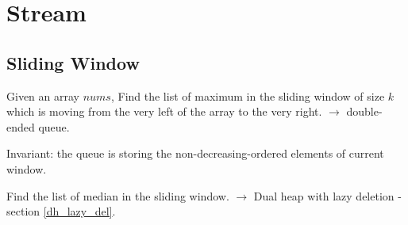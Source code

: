 \chapter{Stream}
\section{Sliding Window}
 Given an array $nums$, Find the list of maximum in the sliding window of size $k$ which is moving from the very left of the array to the very right. $\rightarrow$ double-ended queue.

Invariant: the queue is storing the non-decreasing-ordered elements of current window.

 Find the list of median in the sliding window. $\rightarrow$ Dual heap with lazy deletion - section \ref{dh_lazy_del}.
